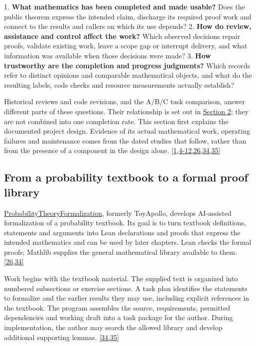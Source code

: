 1. \textbf{What mathematics has been completed and made usable?} Does the public theorem express the intended claim, discharge its required proof work and connect to the results and callers on which its use depends? 2. \textbf{How do review, assistance and control affect the work?} Which observed decisions repair proofs, validate existing work, leave a scope gap or interrupt delivery, and what information was available when those decisions were made? 3. \textbf{How trustworthy are the completion and progress judgments?} Which records refer to distinct opinions and comparable mathematical objects, and what do the resulting labels, code checks and resource measurements actually establish?

Historical reviews and code revisions, and the A/B/C task comparison, answer different parts of these questions. Their relationship is set out in \hyperlink{section-2}{Section 2}; they are not combined into one completion rate. This section first explains the documented project design. Evidence of its actual mathematical work, operating failures and maintenance comes from the dated studies that follow, rather than from the presence of a component in the design alone. \hyperlink{ref-1}{\mbox{[1,4-12,26,34,35]}}

\subsection[From a probability textbook to a formal proof library]{\texorpdfstring{\protect\hypertarget{section-1-1}{}From a probability textbook to a formal proof library}{From a probability textbook to a formal proof library}}
\href{https://github.com/Kind-NK-Hill/ProbabilityTheoryFormalization}{ProbabilityTheoryFormalization}, formerly ToyApollo, develops AI-assisted formalization of a probability textbook. Its goal is to turn textbook definitions, statements and arguments into Lean declarations and proofs that express the intended mathematics and can be used by later chapters. Lean checks the formal proofs; Mathlib supplies the general mathematical library available to them. \hyperlink{ref-26}{\mbox{[26,34]}}

Work begins with the textbook material. The supplied text is organized into numbered subsections or exercise sections. A task plan identifies the statements to formalize and the earlier results they may use, including explicit references in the textbook. The program assembles the source, requirements, permitted dependencies and working draft into a task package for the author. During implementation, the author may search the allowed library and develop additional supporting lemmas. \hyperlink{ref-34}{\mbox{[34,35]}}

